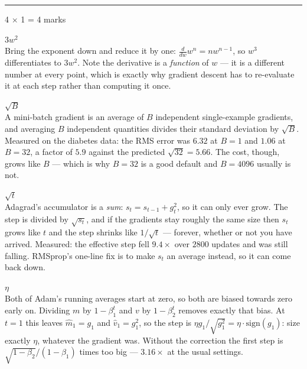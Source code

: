 \documentclass[10pt,a4paper]{article}
\newcommand{\parthead}[2]{\vspace{2pt}\noindent\rule{\linewidth}{0.4pt}\par\vspace{2pt}%
  \noindent{\bfseries Part #1}\hfill{\small #2}\par\vspace{1pt}}
\newcommand{\sol}[1]{\textbf{#1}}
\begin{document}
\vspace{3pt}

\parthead{B --- Fill in the blanks}{4 $\times$ 1 = 4 marks}

\begin{sB}

  \item \sol{$3w^2$}\\ Bring the exponent down and reduce it by one: $\frac{d}{dw}w^n = n w^{n-1}$, so $w^3$ differentiates to $3w^2$. Note the derivative is a \emph{function} of $w$ --- it is a different number at every point, which is exactly why gradient descent has to re-evaluate it at each step rather than computing it once.

  \item \sol{$\sqrt{B}$}\\ A mini-batch gradient is an average of $B$ independent single-example gradients, and averaging $B$ independent quantities divides their standard deviation by $\sqrt{B}$. Measured on the diabetes data: the RMS error was $6.32$ at $B=1$ and $1.06$ at $B=32$, a factor of $5.9$ against the predicted $\sqrt{32} = 5.66$. The cost, though, grows like $B$ --- which is why $B=32$ is a good default and $B=4096$ usually is not.

  \item \sol{$\sqrt{t}$}\\ Adagrad's accumulator is a \emph{sum}: $s_t = s_{t-1} + g_t^2$, so it can only ever grow. The step is divided by $\sqrt{s_t}$, and if the gradients stay roughly the same size then $s_t$ grows like $t$ and the step shrinks like $1/\sqrt{t}$ --- forever, whether or not you have arrived. Measured: the effective step fell $9.4\times$ over $2800$ updates and was still falling. RMSprop's one-line fix is to make $s_t$ an average instead, so it can come back down.

  \item \sol{$\eta$}\\ Both of Adam's running averages start at zero, so both are biased towards zero early on. Dividing $m$ by $1-\beta_1^t$ and $v$ by $1-\beta_2^t$ removes exactly that bias. At $t=1$ this leaves $\hat m_1 = g_1$ and $\hat v_1 = g_1^2$, so the step is $\eta g_1/\sqrt{g_1^2} = \eta \cdot \mathrm{sign}(g_1)$: size exactly $\eta$, whatever the gradient was. Without the correction the first step is $\sqrt{1-\beta_2}/(1-\beta_1)$ times too big --- $3.16\times$ at the usual settings.

\end{sB}
\end{document}
